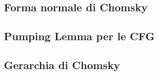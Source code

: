 \documentclass{subfiles}
\begin{document}
\subsection{Forma normale di Chomsky}


\subsection{Pumping Lemma per le CFG}


\subsection{Gerarchia di Chomsky}

\end{document}
